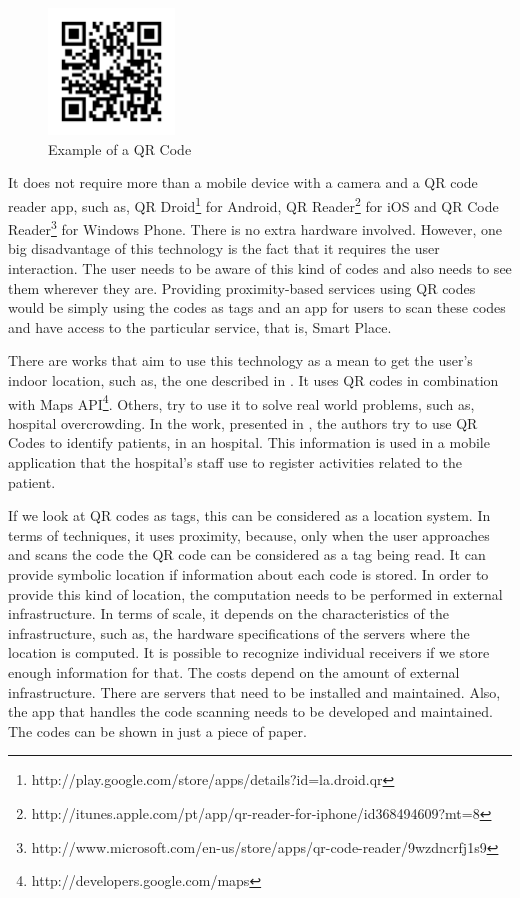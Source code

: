 \begin{figure}[!ht]
  \centering
    \includegraphics[width=0.3\textwidth, keepaspectratio]{figures/qr_code}
    \caption{Example of a QR Code}
    \label{fig:qr_code}
\end{figure}

It does not require more than a mobile device with a camera and a \gls{QR} code reader app, such as, QR Droid\footnote{http://play.google.com/store/apps/details?id=la.droid.qr} for Android, QR Reader\footnote{http://itunes.apple.com/pt/app/qr-reader-for-iphone/id368494609?mt=8} for iOS and QR Code Reader\footnote{http://www.microsoft.com/en-us/store/apps/qr-code-reader/9wzdncrfj1s9} for Windows Phone.
There is no extra hardware involved.
However, one big disadvantage of this technology is the fact that it requires the user interaction.
The user needs to be aware of this kind of codes and also needs to see them wherever they are.
Providing proximity-based services using \gls{QR} codes would be simply using the codes as tags and an app for users to scan these codes and have access to the particular service, that is, Smart Place.

There are works that aim to use this technology as a mean to get the user's indoor location, such as, the one described in \cite{qr_indoor}.
It uses \gls{QR} codes in combination with  Maps \gls{API}\footnote{http://developers.google.com/maps}.
Others, try to use it to solve real world problems, such as, hospital overcrowding.
In the work, presented in \cite{qr_hospital}, the authors try to use \gls{QR} Codes to identify patients, in an hospital.
This information is used in a mobile application that the hospital's staff use to register activities related to the patient.

If we look at \gls{QR} codes as tags, this can be considered as a location system.
In terms of techniques, it uses proximity, because, only when the user approaches and scans the code the \gls{QR} code can be considered as a tag being read.
It can provide symbolic location if information about each code is stored.
In order to provide this kind of location, the computation needs to be performed in external infrastructure.
In terms of scale, it depends on the characteristics of the infrastructure, such as, the hardware specifications of the servers where the location is computed.
It is possible to recognize individual receivers if we store enough information for that.
The costs depend on the amount of external infrastructure. There are servers that need to be installed and maintained.
Also, the app that handles the code scanning needs to be developed and maintained. The codes can be shown in just a piece of paper.

